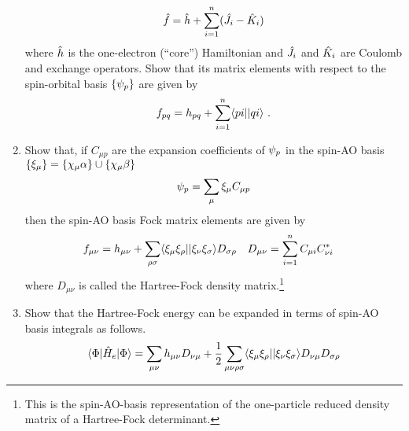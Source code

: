 \documentclass[fleqn,11pt]{article}
\begin{document}
\begin{enumerate}
\begin{align}
  \hat{f}
=
  \hat{h}
+
  \sum_{i=1}^n
  (\hat{J}_i - \hat{K}_i)
\end{align}
  where $\hat{h}$ is the one-electron (``core'') Hamiltonian and $\hat{J}_i$ and $\hat{K}_i$ are Coulomb and exchange operators.
  Show that its matrix elements with respect to the spin-orbital basis $\{\psi_p\}$ are given by
\begin{align}
  f_{pq}
=
  h_{pq}
+
  \sum_{i=1}^n
  \langle pi||qi\rangle\ .
\end{align}
  \item 
  Show that, if $C_{\mu p}$ are the expansion coefficients of $\psi_p$ in the spin-AO basis $\{\xi_\mu\}=\{\chi_\mu\alpha\}\cup\{\chi_\mu\beta\}$
\begin{align}
  \psi_p
=
  \sum_\mu \xi_\mu C_{\mu p}
\end{align}
  then the spin-AO basis Fock matrix elements are given by
\begin{align}
&
  f_{\mu\nu}
=
  h_{\mu\nu}
+
  \sum_{\rho\sigma}
  \langle\xi_\mu\xi_\rho||\xi_\nu\xi_\sigma\rangle D_{\sigma\rho}
&&
  D_{\mu\nu}
=
  \sum_{i=1}^n
  C_{\mu i}C_{\nu i}^*
\end{align}
  where $D_{\mu\nu}$ is called the Hartree-Fock density matrix.\footnote{This is the spin-AO-basis representation of the one-particle reduced density matrix of a Hartree-Fock determinant.}
\item Show that the Hartree-Fock energy can be expanded in terms of spin-AO basis integrals as follows.
\begin{align}
  \langle\Phi|\hat{H}_e|\Phi\rangle
=
  \sum_{\mu\nu}
  h_{\mu\nu}D_{\nu\mu}
+
  \dfrac{1}{2}
  \sum_{\mu\nu\rho\sigma}
  \langle\xi_\mu\xi_\rho||\xi_\nu\xi_\sigma\rangle
  D_{\nu\mu}D_{\sigma\rho}
\end{align}
\end{enumerate}
\end{document}
